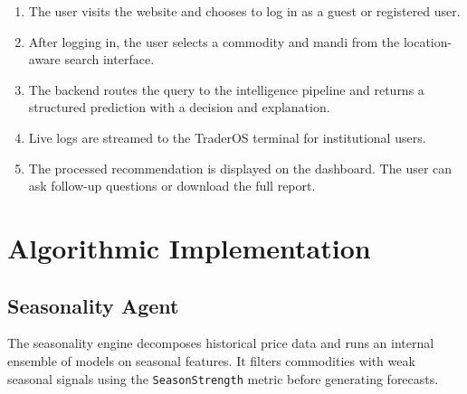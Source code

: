 \documentclass[12pt,a4paper]{report}
\theoremstyle{definition}
\theoremstyle{remark}
\begin{document}
\begin{enumerate}
    \item The user visits the website and chooses to log in as a guest or registered user.
    \item After logging in, the user selects a commodity and mandi from the location-aware search interface.
    \item The backend routes the query to the intelligence pipeline and returns a structured prediction with a decision and explanation.
    \item Live logs are streamed to the TraderOS terminal for institutional users.
    \item The processed recommendation is displayed on the dashboard. The user can ask follow-up questions or download the full report.
\end{enumerate}

\section{Algorithmic Implementation}

\subsection{Seasonality Agent}

The seasonality engine decomposes historical price data and runs an internal ensemble of models on seasonal features. It filters commodities with weak seasonal signals using the \texttt{SeasonStrength} metric before generating forecasts.
\end{document}
